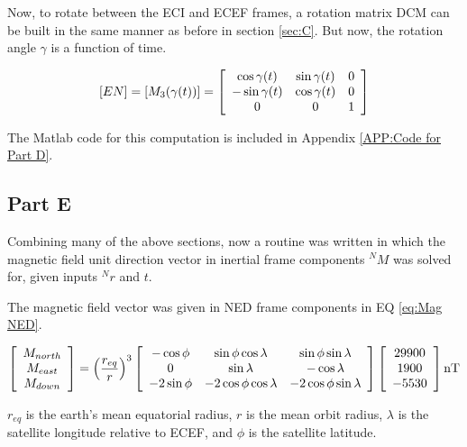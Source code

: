 \documentclass[11pt]{aiaa-tc}%
\newcommand{\parens} [1] {\left(  #1  \right)}
\newcommand{\brackets} [1] {\left[ #1 \right]}
\newcommand{\arrayb}[2]{\brackets{ \begin{array}{#1}  #2 \end{array} } }
\begin{document}
Now, to rotate between the ECI and ECEF frames, a rotation matrix DCM can be built in the same manner as before in section \ref{sec:C}. But now, the rotation angle $\gamma$ is a function of time.

\begin{equation}
	\label{EQ:ECI2ECF DCM}
	[EN]=[M_3(\gamma(t))] = 
	\arrayb{c c c}{
		\cos{\gamma(t)} 	& 	\sin{\gamma(t)} 	&	0	\\
		-\sin{\gamma(t)} 	&	\cos{\gamma(t)} 	& 	0	\\
		0			&		0		&	1			
	}
\end{equation}

The Matlab code for this computation is included in Appendix \ref{APP:Code for Part D}.



\subsection{Part E}
\label{sec:Mag}
Combining many of the above sections, now a routine was written in which the magnetic field unit direction vector in inertial frame components $^NM$ was solved for, given inputs $^Nr$ and $t$. 

The magnetic field vector was given in NED frame components in EQ \ref{eq:Mag NED}.

\begin{equation}
	\label{eq:Mag NED}
	\arrayb{c}{M_{north} \\ M_{east} \\ M_{down}\\} 
	=
	\parens{\frac{r_{eq}}{r}}^3
	\arrayb{ccc}{ -\cos{\phi} 		& 	\sin{\phi}\cos{\lambda} 		& 	\sin{\phi}\sin{\lambda}	\\
				0			&		\sin{\lambda}			&		-\cos{\lambda} 		\\
				-2\sin{\phi} 	&	-2\cos{\phi}\cos{\lambda}		&	-2\cos{\phi}\sin{\lambda} }
	\arrayb{c}{29900 \\ 1900 \\ -5530\\} \textnormal{nT}
\end{equation}

$r_{eq}$ is the earth's mean equatorial radius, $r$ is the mean orbit radius, $\lambda$ is the satellite longitude relative to ECEF, and $\phi$ is the satellite latitude. 
\end{document}
